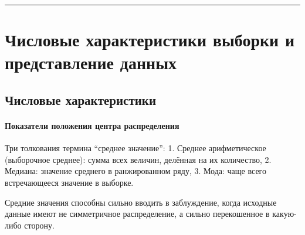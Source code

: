 \documentclass[11pt,a4paper]{article}
\renewcommand{\linethickness}{0.1ex}
\begin{document}
    \begin{center}\rule{0.5\linewidth}{\linethickness}\end{center}

    \hypertarget{ux447ux438ux441ux43bux43eux432ux44bux435-ux445ux430ux440ux430ux43aux442ux435ux440ux438ux441ux442ux438ux43aux438-ux432ux44bux431ux43eux440ux43aux438-ux438-ux43fux440ux435ux434ux441ux442ux430ux432ux43bux435ux43dux438ux435-ux434ux430ux43dux43dux44bux445}{%
\section{Числовые характеристики выборки и представление
данных}\label{ux447ux438ux441ux43bux43eux432ux44bux435-ux445ux430ux440ux430ux43aux442ux435ux440ux438ux441ux442ux438ux43aux438-ux432ux44bux431ux43eux440ux43aux438-ux438-ux43fux440ux435ux434ux441ux442ux430ux432ux43bux435ux43dux438ux435-ux434ux430ux43dux43dux44bux445}}

\hypertarget{ux447ux438ux441ux43bux43eux432ux44bux435-ux445ux430ux440ux430ux43aux442ux435ux440ux438ux441ux442ux438ux43aux438}{%
\subsection{Числовые
характеристики}\label{ux447ux438ux441ux43bux43eux432ux44bux435-ux445ux430ux440ux430ux43aux442ux435ux440ux438ux441ux442ux438ux43aux438}}

\hypertarget{ux43fux43eux43aux430ux437ux430ux442ux435ux43bux438-ux43fux43eux43bux43eux436ux435ux43dux438ux44f-ux446ux435ux43dux442ux440ux430-ux440ux430ux441ux43fux440ux435ux434ux435ux43bux435ux43dux438ux44f}{%
\paragraph{Показатели положения центра
распределения}\label{ux43fux43eux43aux430ux437ux430ux442ux435ux43bux438-ux43fux43eux43bux43eux436ux435ux43dux438ux44f-ux446ux435ux43dux442ux440ux430-ux440ux430ux441ux43fux440ux435ux434ux435ux43bux435ux43dux438ux44f}}

Три толкования термина ``среднее значение'': 1. Среднее арифметическое
(выборочное среднее): сумма всех величин, делённая на их количество, 2.
Медиана: значение среднего в ранжированном ряду, 3. Мода: чаще всего
встречающееся значение в выборке.

Средние значения способны сильно вводить в заблуждение, когда исходные
данные имеют не симметричное распределение, а сильно перекошенное в
какую-либо сторону.
\end{document}
